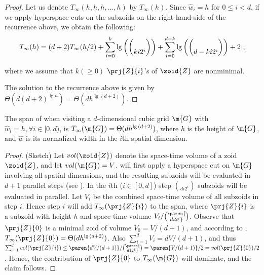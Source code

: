 \begin{proof}
Let us denote $T_{\infty}(h, h, h, \ldots, h)$ by
$T_{\infty}(h)$. Since ${\widehat{w}}_i = h$ for $0 \leq i < d$, if we
apply hyperspace cuts on the subzoids on the right hand side of the
recurrence above, we obtain the following:
\[
T_{\infty}{\left(h\right)} 
= ( d + 2 ) T_{\infty}(h/2)
+ \sum_{i = 0}^{k}{\lg{\left( \choose{k}{i} 2^i \right)}} + \sum_{i = 0}^{d - k}{\lg{\left( \choose{d - k}{i} 2^i \right)}} + 2\ ,
\]
%

\noindent
where we assume that $k (\geq 0)$ $\prj{Z}{i}$'s
of $\zoid{Z}$ are nonminimal.

The solution to the recurrence above is given by
$\Theta(d (d + 2)^{\lg{h}}) = \Theta( dh^{\lg{( d + 2)}} )$.
%
\end{proof}




\begin{corollary}
  The span of  when visiting a $d$-dimensional
  cubic grid $\m{G}$ with ${\widehat{w}}_i = h, \forall{i} \in [0, d)$, 
  is $T_{\infty}(\m{G}) = \Theta(dh^{\lg{(d + 2)}})$, where $h$ is the 
  height of $\m{G}$, and ${\widehat{w}}$ is its normalized width in 
  the $i$th spatial dimension.
\label{cor:HyperspaceCutGrid}
\end{corollary}
%
\begin{proof}(Sketch)
%
Let $vol(\zoid{Z})$ denote the space-time volume of a zoid
$\zoid{Z}$, and let $vol(\m{G}) = V$.
 will first apply a hyperspace cut on $\m{G}$ involving all
spatial dimensions, and the resulting subzoids will be evaluated in $d + 1$
parallel steps (see ). In the $i$th ($i \in [0, d]$) 
step $\choose{d}{i} 2^i$ subzoids will be evaluated in parallel.
Let $V_i$ be the combined space-time volume of all subzoids
in step $i$. Hence step $i$ will add $T_{\infty}(\prj{Z}{i})$ to the span, where
$\prj{Z}{i}$ is a subzoid with height $h$ and space-time volume
$V_i / \paren{ \choose{d}{i} 2^i }$. Observe that
$\prj{Z}{0}$ is a minimal zoid of volume $V_0 = V / (d + 1)$,
and according to , 
$T_{\infty}(\prj{Z}{0}) = \Theta(dh^{\lg{(d + 2)}})$.
Also $\sum_{i = 1}^{d}{V_i} = dV / (d + 1)$,
and thus $\sum_{i = 1}^{d}{vol(\prj{Z}{i})} \leq \paren{dV / (d + 1)} / \paren{\choose{d}{1} 2^1}
= \paren{ V / (d + 1) } / 2 = vol(\prj{Z}{0}) / 2$. Hence,
the contribution of $\prj{Z}{0}$ to $T_{\infty}(\m{G})$
will dominate, and the claim follows.
%
\end{proof}


